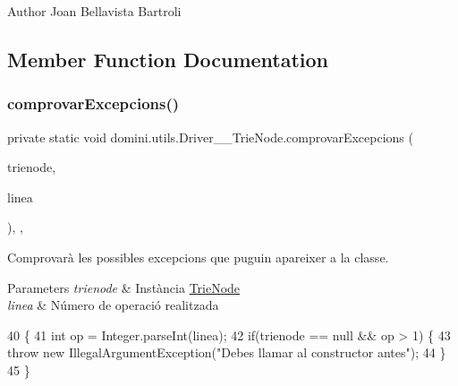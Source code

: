 \begin{DoxyAuthor}{Author}
Joan Bellavista Bartroli 
\end{DoxyAuthor}


\subsection{Member Function Documentation}
\mbox{\label{classdomini_1_1utils_1_1Driver____TrieNode_aa763a74162f647ee153c5cea01d371d0}} 
\subsubsection{\texorpdfstring{comprovar\+Excepcions()}{comprovarExcepcions()}}
{\footnotesize\ttfamily private static void domini.\+utils.\+Driver\+\_\+\+\_\+\+Trie\+Node.\+comprovar\+Excepcions (\begin{DoxyParamCaption}\item[{\hyperlink{classdomini_1_1utils_1_1TrieNode}{Trie\+Node}$<$ Byte $>$}]{trienode,  }\item[{String}]{linea }\end{DoxyParamCaption})\hspace{0.3cm}{\ttfamily [inline]}, {\ttfamily [static]}, {\ttfamily [private]}}



Comprovarà les possibles excepcions que puguin apareixer a la classe. 


\begin{DoxyParams}{Parameters}
{\em trienode} & Instància \hyperlink{classdomini_1_1utils_1_1TrieNode}{Trie\+Node} \\
\hline
{\em linea} & Número de operació realitzada \\
\hline
\end{DoxyParams}

\begin{DoxyCode}
40                                                                                   \{
41         \textcolor{keywordtype}{int} op = Integer.parseInt(linea);
42         \textcolor{keywordflow}{if}(trienode == null && op > 1) \{
43             \textcolor{keywordflow}{throw} \textcolor{keyword}{new} IllegalArgumentException(\textcolor{stringliteral}{"Debes llamar al constructor antes"});
44         \}
45     \}
\end{DoxyCode}
\mbox{\label{classdomini_1_1utils_1_1Driver____TrieNode_a19cb816408fb6b32cca0ea8ae8bc4153}} 

